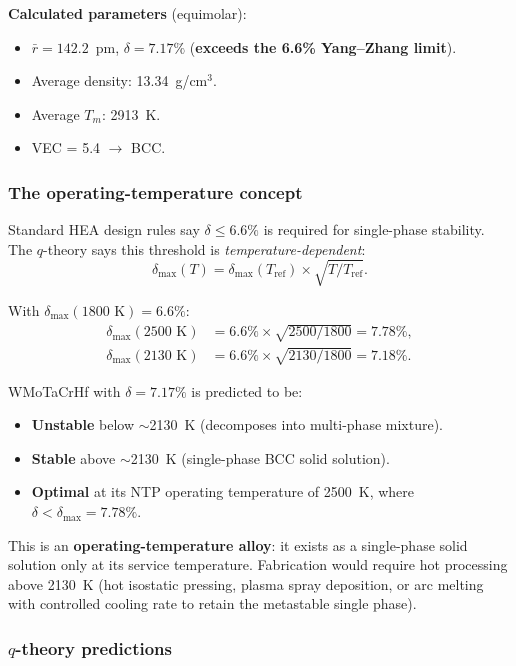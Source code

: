 \documentclass[12pt,letterpaper]{article}
\theoremstyle{definition}
\begin{document}
\textbf{Calculated parameters} (equimolar):
\begin{itemize}
  \item $\bar{r} = 142.2$~pm, \quad $\delta = 7.17\%$ \quad (\textbf{exceeds the 6.6\% Yang--Zhang limit}).
  \item Average density: 13.34~g/cm$^3$.
  \item Average $T_m$: 2913~K.
  \item VEC = 5.4 $\to$ BCC.
\end{itemize}

\subsubsection{The operating-temperature concept}

Standard HEA design rules say $\delta \leq 6.6\%$ is required for single-phase stability.  The $q$-theory says this threshold is \emph{temperature-dependent}:
\begin{equation}
  \delta_{\max}(T) = \delta_{\max}(T_{\mathrm{ref}}) \times \sqrt{T / T_{\mathrm{ref}}}.
\end{equation}

With $\delta_{\max}(1800\text{~K}) = 6.6\%$:
\begin{align}
  \delta_{\max}(2500\text{~K}) &= 6.6\% \times \sqrt{2500/1800} = 7.78\%, \\
  \delta_{\max}(2130\text{~K}) &= 6.6\% \times \sqrt{2130/1800} = 7.18\%.
\end{align}

WMoTaCrHf with $\delta = 7.17\%$ is predicted to be:
\begin{itemize}
  \item \textbf{Unstable} below $\sim$2130~K (decomposes into multi-phase mixture).
  \item \textbf{Stable} above $\sim$2130~K (single-phase BCC solid solution).
  \item \textbf{Optimal} at its NTP operating temperature of 2500~K, where $\delta < \delta_{\max} = 7.78\%$.
\end{itemize}

This is an \textbf{operating-temperature alloy}: it exists as a single-phase solid solution only at its service temperature.  Fabrication would require hot processing above 2130~K (hot isostatic pressing, plasma spray deposition, or arc melting with controlled cooling rate to retain the metastable single phase).

\subsubsection{$q$-theory predictions}
\end{document}
